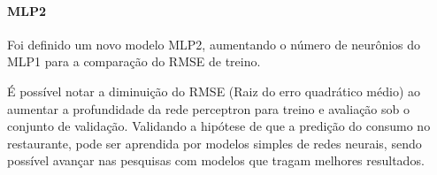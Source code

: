 \documentclass[	12pt, Times, openright, twoside, a4paper, english, brazil]{abntex2}
\begin{document}
    	        \paragraph{MLP2}
    	        Foi definido um novo modelo MLP2, aumentando o número de neurônios do MLP1 para a comparação do RMSE de treino.
    	        \begin{figure}[H]
                \end{figure}
                \begin{figure}[H]
                \end{figure}
    	        É possível notar a diminuição do RMSE (Raiz do erro quadrático médio) ao aumentar a profundidade da rede perceptron para treino e avaliação sob o conjunto de validação. Validando a hipótese de que a predição do consumo no restaurante, pode ser aprendida por modelos simples de redes neurais, sendo possível avançar nas pesquisas com modelos que tragam melhores resultados.
\end{document}
